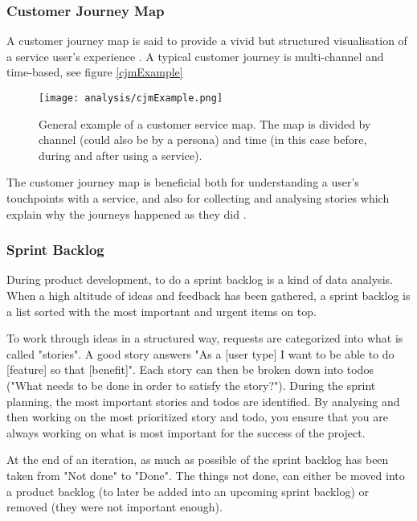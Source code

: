 \subsubsection{Customer Journey Map}
A customer journey map is said to provide a vivid but structured visualisation of a service user's experience \citep{stickdorn}. A typical customer journey is multi-channel and time-based, see figure \ref{cjmExample}

\begin{figure}[h]
    \centering
    \texttt{[image: analysis/cjmExample.png]}
    \caption{General example of a customer service map. The map is divided by channel (could also be by a persona) and time (in this case before, during and after using a service).}
    \label{fig:cjmExample}
\end{figure}

The customer journey map is beneficial both for understanding a user's touchpoints with a service, and also for collecting and analysing stories which explain why the journeys happened as they did \citep{stickdorn}.

\subsubsection{Sprint Backlog}
During product development, to do a sprint backlog is a kind of data analysis. When a high altitude of ideas and feedback has been gathered, a sprint backlog is a list sorted with the most important and urgent items on top.

To work through ideas in a structured way, requests are categorized into what is called "stories". A good story answers "As a [user type] I want to be able to do [feature] so that [benefit]". Each story can then be broken down into todos ("What needs to be done in order to satisfy the story?"). During the sprint planning, the most important stories and todos are identified. By analysing and then working on the most prioritized story and todo, you ensure that you are always working on what is most important for the success of the project.

At the end of an iteration, as much as possible of the sprint backlog has been taken from "Not done" to "Done". The things not done, can either be moved into a product backlog (to later be added into an upcoming sprint backlog) or removed (they were not important enough).

